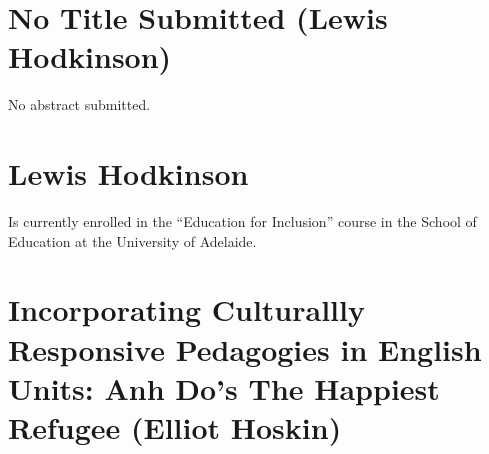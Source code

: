 \documentclass[twoside,14pt,a4paper,notitlepage]{memoir}
\begin{document}
\section*{No Title Submitted (Lewis Hodkinson)}
\label{aut:hodkinson}

No abstract submitted.

\section*{Lewis Hodkinson}

Is currently enrolled in the ``Education for Inclusion'' course in the School of Education at the University of Adelaide.



\section*{Incorporating Culturallly Responsive Pedagogies in English Units: Anh Do's The Happiest Refugee (Elliot Hoskin)}
\label{aut:hoskin}
\end{document}
